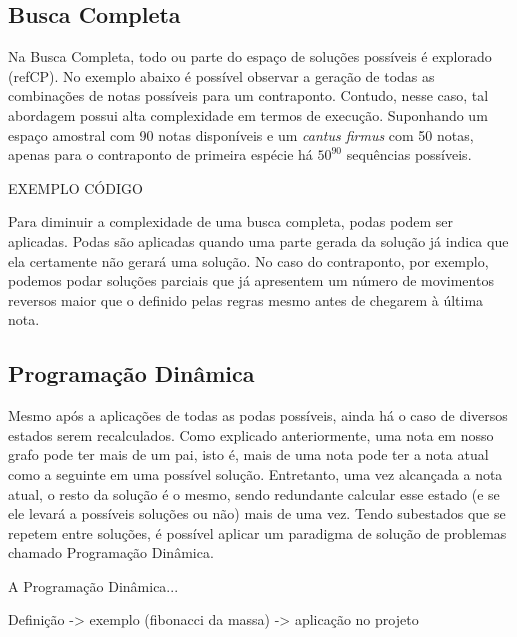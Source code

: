     \subsection[Busca Completa]{Busca Completa}

      Na Busca Completa, todo ou parte do espaço de soluções possíveis é explorado (refCP). No exemplo abaixo é possível observar a geração de todas as combinações de notas possíveis para um contraponto. Contudo, nesse caso, tal abordagem possui alta complexidade em termos de execução. Suponhando um espaço amostral com 90 notas disponíveis e um \textit{cantus firmus} com 50 notas, apenas para o contraponto de primeira espécie há $50^{90}$ sequências possíveis.

      EXEMPLO CÓDIGO

      Para diminuir a complexidade de uma busca completa, podas podem ser aplicadas. Podas são aplicadas quando uma parte gerada da solução já indica que ela certamente não gerará uma solução. No caso do contraponto, por exemplo, podemos podar soluções parciais que já apresentem um número de movimentos reversos maior que o definido pelas regras mesmo antes de chegarem à última nota.

    \subsection[Programação Dinâmica]{Programação Dinâmica}

      Mesmo após a aplicações de todas as podas possíveis, ainda há o caso de diversos estados serem recalculados. Como explicado anteriormente, uma nota em nosso grafo pode ter mais de um pai, isto é, mais de uma nota pode ter a nota atual como a seguinte em uma possível solução. Entretanto, uma vez alcançada a nota atual, o resto da solução é o mesmo, sendo redundante calcular esse estado (e se ele levará a possíveis soluções ou não) mais de uma vez. Tendo subestados que se repetem entre soluções, é possível aplicar um paradigma de solução de problemas chamado Programação Dinâmica.

      A Programação Dinâmica...

      Definição -> exemplo (fibonacci da massa) -> aplicação no projeto
